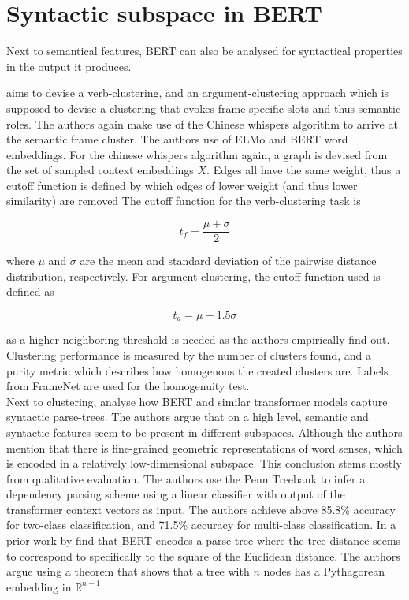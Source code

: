 \documentclass[a4paper,12pt,twoside,openright]{report}
\begin{document}


\section{Syntactic subspace in BERT}

Next to semantical features, BERT can also be analysed for syntactical properties in the output it produces.

\cite{ribeiro19} aims to devise a verb-clustering, and an argument-clustering approach which is supposed to devise a clustering that evokes frame-specific slots and thus semantic roles.
The authors again make use of the Chinese whispers algorithm
\cite{biemann06} to arrive at the semantic frame cluster.
The authors use of ELMo and BERT word embeddings.
For the chinese whispers algorithm again, a graph is devised from the set of sampled context embeddings $X$.
Edges all have the same weight, thus a cutoff function is defined by  which edges of lower weight (and thus lower similarity) are removed
The cutoff function for the verb-clustering task is

\begin{equation}
t_f = \frac{\mu + \sigma}{2}
\end{equation}

where $\mu$ and $\sigma$ are the mean and standard deviation of the pairwise distance distribution, respectively. 
For argument clustering, the cutoff function used is defined as

\begin{equation}
t_a = \mu - 1.5 \sigma
\end{equation}

as a higher neighboring threshold is needed as the authors empirically find out.
Clustering performance is measured by the number of clusters found, and a purity metric which describes how homogenous the created clusters are. 
Labels from FrameNet \cite{baker98} are used for the homogenuity test. \\

Next to clustering, \cite{coenen19} analyse how BERT and similar transformer models capture syntactic parse-trees.
The authors argue that on a high level, semantic and syntactic features seem to be present in different subspaces.
Although the authors mention that there is fine-grained geometric representations of word senses, which is encoded in a relatively low-dimensional subspace.
This conclusion stems mostly from qualitative evaluation.
The authors use the Penn Treebank \cite{marcu93} to infer a dependency parsing scheme using a linear classifier with output of the transformer context vectors as input.
The authors achieve above 85.8\% accuracy for two-class classification, and 71.5\% accuracy for multi-class classification.
In a prior work by \cite{hewitt19} find that BERT encodes a parse tree where the tree distance seems to correspond to specifically to the square of the Euclidean distance.
The authors argue using a theorem that shows that a tree with $n$ nodes has a Pythagorean embedding in $\mathbb{R}^{n-1}$.
\end{document}
